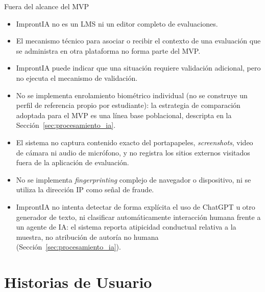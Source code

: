 \begin{keyfinding}{Fuera del alcance del MVP}
\begin{itemize}
    \item ImprontIA no es un LMS ni un editor completo de evaluaciones.
    \item El mecanismo técnico para asociar o recibir el contexto de una evaluación que se administra en otra plataforma no forma parte del MVP.
    \item ImprontIA puede indicar que una situación requiere validación adicional, pero no ejecuta el mecanismo de validación.
    \item No se implementa enrolamiento biométrico individual (no se construye un perfil de referencia propio por estudiante): la estrategia de comparación adoptada para el MVP es una línea base poblacional, descripta en la Sección~\ref{sec:procesamiento_ia}.
    \item El sistema no captura contenido exacto del portapapeles, \textit{screenshots}, video de cámara ni audio de micrófono, y no registra los sitios externos visitados fuera de la aplicación de evaluación.
    \item No se implementa \textit{fingerprinting} complejo de navegador o dispositivo, ni se utiliza la dirección IP como señal de fraude.
    \item ImprontIA no intenta detectar de forma explícita el uso de ChatGPT u otro generador de texto, ni clasificar automáticamente interacción humana frente a un agente de IA: el sistema reporta atipicidad conductual relativa a la muestra, no atribución de autoría no humana (Sección~\ref{sec:procesamiento_ia}).
\end{itemize}
\end{keyfinding}

\section{Historias de Usuario}

